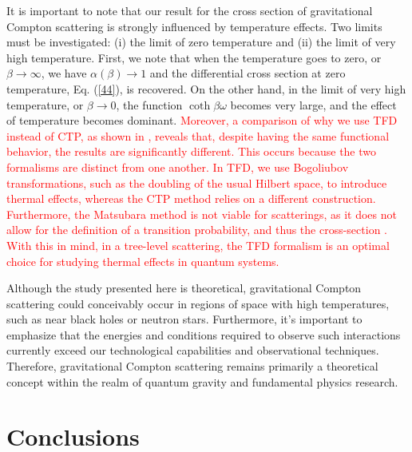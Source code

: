 \documentclass[11pt,showpacs,preprintnumbers,amsmath,amssymb,prd,nofootinbib,superscriptaddress]{revtex4-2}
\begin{document}
It is important to note that our result for the cross section of gravitational Compton scattering is strongly influenced by temperature effects. Two limits must be investigated: (i) the limit of zero temperature and (ii) the limit of very high temperature. First, we note that when the temperature goes to zero, or $\beta\rightarrow \infty$, we have
$\alpha(\beta)\rightarrow 1$
and the differential cross section at zero temperature, Eq. (\ref{44}), is recovered. On the other hand, in the limit of very high temperature, or  $\beta\rightarrow 0$, the function $\coth{\beta\omega}$ becomes very large, and the effect of temperature becomes dominant. \textcolor{red}{Moreover, a comparison of why we use TFD instead of CTP, as shown in \cite{cabral}, reveals that, despite having the same functional behavior, the results are significantly different. This occurs because the two formalisms are distinct from one another. In TFD, we use Bogoliubov transformations, such as the doubling of the usual Hilbert space, to introduce thermal effects, whereas the CTP method relies on a different construction. Furthermore, the Matsubara method is not viable for scatterings, as it does not allow for the definition of a transition probability, and thus the cross-section \cite{xu1995compton}. With this in mind, in a tree-level scattering, the TFD formalism is an optimal choice for studying thermal effects in quantum systems.}

Although the study presented here is theoretical, gravitational Compton scattering could conceivably occur in regions of space with high temperatures, such as near black holes or neutron stars. Furthermore, it's important to emphasize that the energies and conditions required to observe such interactions currently exceed our technological capabilities and observational techniques. Therefore, gravitational Compton scattering remains primarily a theoretical concept within the realm of quantum gravity and fundamental physics research.



\section{Conclusions}\label{V}
\end{document}
